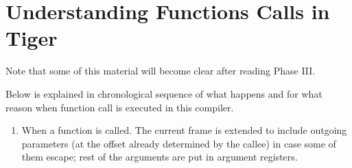 \section{Understanding Functions Calls in Tiger}

\begin{tcolorbox}
  Note that some of this material will become clear after reading Phase III.
\end{tcolorbox}

Below is explained in chronological sequence of what happens and for
what reason when function call is executed in this compiler.

\begin{enumerate}
\def\labelenumi{\arabic{enumi}.}
\item
  When a function is called. The current frame is extended to include
  outgoing parameters (at the offset already determined by the callee)
  in case some of them escape; rest of the arguments are put in argument
  registers.


\end{enumerate}
